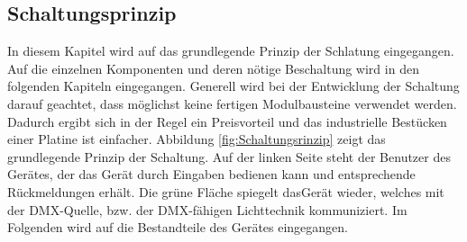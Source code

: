 
\subsection{Schaltungsprinzip}

In diesem Kapitel wird auf das grundlegende Prinzip der Schlatung eingegangen. Auf die einzelnen Komponenten und deren nötige Beschaltung wird in den folgenden Kapiteln eingegangen. Generell wird bei der Entwicklung der Schaltung darauf geachtet, dass möglichst keine fertigen Modulbausteine verwendet werden. Dadurch ergibt sich in der Regel ein Preisvorteil und das industrielle Bestücken einer Platine ist einfacher.%
Abbildung \ref{fig:Schaltungsrinzip} zeigt das grundlegende Prinzip der Schaltung. Auf der linken Seite steht der Benutzer des Gerätes, der das Gerät durch Eingaben bedienen kann und entsprechende Rückmeldungen erhält. Die grüne Fläche spiegelt dasGerät wieder, welches mit der DMX-Quelle, bzw. der DMX-fähigen Lichttechnik kommuniziert. Im Folgenden wird auf die Bestandteile des Gerätes eingegangen.


